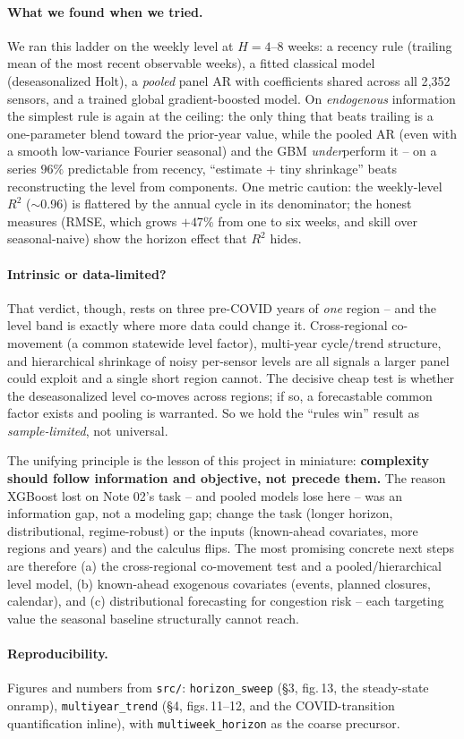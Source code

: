 \documentclass[11pt]{article}
\begin{document}
\paragraph{What we found when we tried.} We ran this ladder on the weekly level at
$H{=}4$--$8$ weeks: a recency rule (trailing mean of the most recent observable
weeks), a fitted classical model (deseasonalized Holt), a \emph{pooled} panel AR
with coefficients shared across all 2{,}352 sensors, and a trained global
gradient-boosted model. On \emph{endogenous} information the simplest rule is again
at the ceiling: the only thing that beats trailing is a one-parameter blend toward
the prior-year value, while the pooled AR (even with a smooth low-variance Fourier
seasonal) and the GBM \emph{under}perform it -- on a series $96\%$ predictable from
recency, ``estimate $+$ tiny shrinkage'' beats reconstructing the level from
components. One metric caution: the weekly-level $R^2$ ($\sim$0.96) is flattered by
the annual cycle in its denominator; the honest measures (RMSE, which grows $+47\%$
from one to six weeks, and skill over seasonal-naive) show the horizon effect that
$R^2$ hides.

\paragraph{Intrinsic or data-limited?} That verdict, though, rests on three
pre-COVID years of \emph{one} region -- and the level band is exactly where more
data could change it. Cross-regional co-movement (a common statewide level factor),
multi-year cycle/trend structure, and hierarchical shrinkage of noisy per-sensor
levels are all signals a larger panel could exploit and a single short region
cannot. The decisive cheap test is whether the deseasonalized level co-moves across
regions; if so, a forecastable common factor exists and pooling is warranted. So we
hold the ``rules win'' result as \emph{sample-limited}, not universal.

The unifying principle is the lesson of this project in miniature:
\textbf{complexity should follow information and objective, not precede them.}
The reason XGBoost lost on Note 02's task -- and pooled models lose here -- was an
information gap, not a modeling gap; change the task (longer horizon,
distributional, regime-robust) or the inputs (known-ahead covariates, more regions
and years) and the calculus flips. The most promising concrete next steps are
therefore (a) the cross-regional co-movement test and a pooled/hierarchical level
model, (b) known-ahead exogenous covariates (events, planned closures, calendar),
and (c) distributional forecasting for congestion risk -- each targeting value the
seasonal baseline structurally cannot reach.

\paragraph{Reproducibility.} Figures and numbers from \texttt{src/}:
\texttt{horizon\_sweep} (\S3, fig.\,13, the steady-state onramp),
\texttt{multiyear\_trend} (\S4, figs.\,11--12, and the COVID-transition
quantification inline), with \texttt{multiweek\_horizon} as the coarse precursor.
\end{document}
